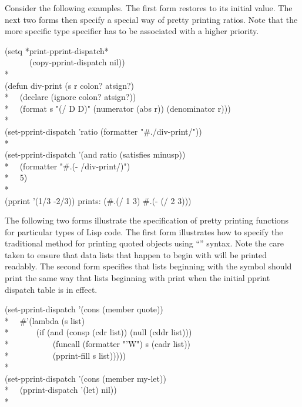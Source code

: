 Consider the following examples.  The first form restores
 to its initial value.
The next two forms then specify a special way of pretty printing ratios.  Note that the more specific type
specifier has to be associated with a higher priority.
\begin{lisp}
(setq *print-pprint-dispatch* \\
~~~~~~(copy-pprint-dispatch nil)) \\*
\\
(defun div-print (s r colon? atsign?) \\*
~~(declare (ignore colon? atsign?)) \\*
~~(format s "(/ {\Xtilde}D {\Xtilde}D)" (numerator (abs r)) (denominator r))) \\*
\\
(set-pprint-dispatch 'ratio (formatter "\#.\Xtilde/div-print/")) \\*
\\
(set-pprint-dispatch '(and ratio (satisfies minusp)) \\*
~~(formatter "\#.(- \Xtilde/div-print/)") \\*
~~5) \\*
\\
(pprint '(1/3 -2/3)) {\rm prints:} (\#.(/ 1 3) \#.(- (/ 2 3)))
\end{lisp}

The following two forms illustrate the specification of pretty printing
functions for particular types of Lisp code.  The first form illustrates how to
specify the traditional method for printing quoted objects using ``''
syntax.  Note the care taken to ensure that data lists that happen to begin
with  will be printed readably.  The second form specifies that lists
beginning with the symbol  should print the same way that lists
beginning with  print when the initial pprint dispatch table is in effect.
\begin{lisp}
(set-pprint-dispatch '(cons (member quote)) \\*
~~\#'(lambda (s list) \\*
~~~~~~(if (and (consp (cdr list)) (null (cddr list))) \\*
~~~~~~~~~~(funcall (formatter "'{\Xtilde}W") s (cadr list)) \\*
~~~~~~~~~~(pprint-fill s list))))) \\*
\\
(set-pprint-dispatch '(cons (member my-let)) \\*
~~(pprint-dispatch '(let) nil)) \\*
\end{lisp}

